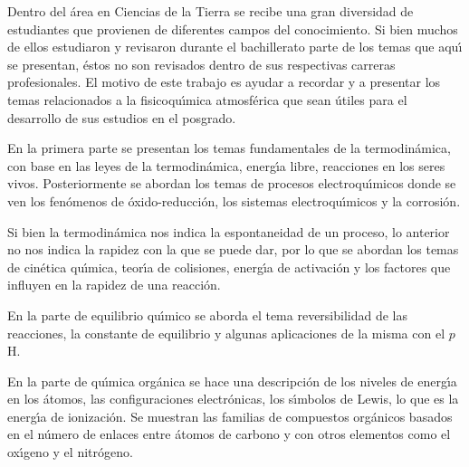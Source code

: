 \documentclass[spanish]{WileySix}
\begin{document}
 
 


%
 \begin{preface}

Dentro del \'area en Ciencias de la Tierra se recibe una gran diversidad de estudiantes que provienen de diferentes campos del conocimiento. Si bien muchos de ellos estudiaron y revisaron durante el bachillerato parte de los temas que aqu\'{\i} se presentan, \'estos no son revisados dentro de sus respectivas carreras profesionales. El motivo de este trabajo es ayudar  a recordar y a presentar los temas relacionados a la fisicoqu\'{\i}mica atmosf\'erica que sean \'utiles para el desarrollo de sus estudios en el posgrado.

 En la primera parte se presentan los temas fundamentales de la termodin\'amica, con base en las leyes de la termodin\'amica, energ\'{\i}a libre, reacciones en los seres vivos. Posteriormente se abordan los temas de procesos electroqu\'{\i}micos donde se ven los fen\'omenos de \'oxido-reducci\'on, los sistemas electroqu\'{\i}micos y la corrosi\'on.
 
 Si bien la termodin\'amica nos indica la espontaneidad de un proceso, lo anterior no nos indica la rapidez con la que se puede dar, por lo que se abordan los temas de cin\'etica qu\'{\i}mica, teor\'{\i}a de colisiones, energ\'{\i}a de activaci\'on  y los factores que influyen en la rapidez de una reacci\'on.
 
 En la parte de equilibrio qu\'{\i}mico se aborda el tema reversibilidad de las reacciones, la constante de equilibrio y algunas aplicaciones de la misma con el $p$H.
 
 En la parte de qu\'{\i}mica org\'anica se hace una descripci\'on de los niveles de energ\'{\i}a en los \'atomos, las configuraciones electr\'onicas, los s\'{\i}mbolos de Lewis, lo que es la energ\'{\i}a de ionizaci\'on. Se muestran las familias de compuestos org\'anicos basados en el n\'umero de enlaces entre \'atomos de carbono y con otros elementos como el ox\'{\i}geno y el nitr\'ogeno.
 

\end{preface}
\end{document}
